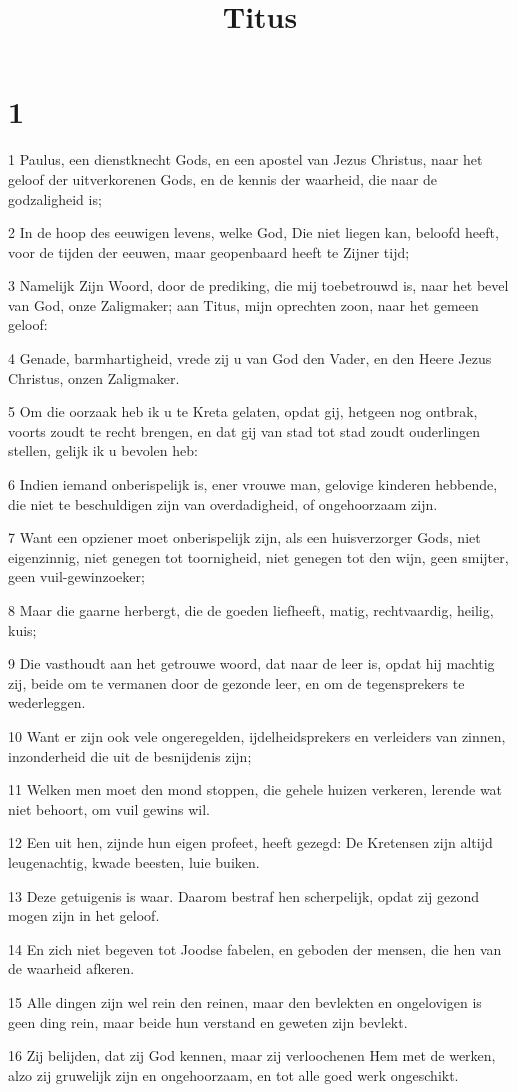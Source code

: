 

\title{Titus}



\chapter{1}

\par 1 Paulus, een dienstknecht Gods, en een apostel van Jezus Christus, naar het geloof der uitverkorenen Gods, en de kennis der waarheid, die naar de godzaligheid is;
\par 2 In de hoop des eeuwigen levens, welke God, Die niet liegen kan, beloofd heeft, voor de tijden der eeuwen, maar geopenbaard heeft te Zijner tijd;
\par 3 Namelijk Zijn Woord, door de prediking, die mij toebetrouwd is, naar het bevel van God, onze Zaligmaker; aan Titus, mijn oprechten zoon, naar het gemeen geloof:
\par 4 Genade, barmhartigheid, vrede zij u van God den Vader, en den Heere Jezus Christus, onzen Zaligmaker.
\par 5 Om die oorzaak heb ik u te Kreta gelaten, opdat gij, hetgeen nog ontbrak, voorts zoudt te recht brengen, en dat gij van stad tot stad zoudt ouderlingen stellen, gelijk ik u bevolen heb:
\par 6 Indien iemand onberispelijk is, ener vrouwe man, gelovige kinderen hebbende, die niet te beschuldigen zijn van overdadigheid, of ongehoorzaam zijn.
\par 7 Want een opziener moet onberispelijk zijn, als een huisverzorger Gods, niet eigenzinnig, niet genegen tot toornigheid, niet genegen tot den wijn, geen smijter, geen vuil-gewinzoeker;
\par 8 Maar die gaarne herbergt, die de goeden liefheeft, matig, rechtvaardig, heilig, kuis;
\par 9 Die vasthoudt aan het getrouwe woord, dat naar de leer is, opdat hij machtig zij, beide om te vermanen door de gezonde leer, en om de tegensprekers te wederleggen.
\par 10 Want er zijn ook vele ongeregelden, ijdelheidsprekers en verleiders van zinnen, inzonderheid die uit de besnijdenis zijn;
\par 11 Welken men moet den mond stoppen, die gehele huizen verkeren, lerende wat niet behoort, om vuil gewins wil.
\par 12 Een uit hen, zijnde hun eigen profeet, heeft gezegd: De Kretensen zijn altijd leugenachtig, kwade beesten, luie buiken.
\par 13 Deze getuigenis is waar. Daarom bestraf hen scherpelijk, opdat zij gezond mogen zijn in het geloof.
\par 14 En zich niet begeven tot Joodse fabelen, en geboden der mensen, die hen van de waarheid afkeren.
\par 15 Alle dingen zijn wel rein den reinen, maar den bevlekten en ongelovigen is geen ding rein, maar beide hun verstand en geweten zijn bevlekt.
\par 16 Zij belijden, dat zij God kennen, maar zij verloochenen Hem met de werken, alzo zij gruwelijk zijn en ongehoorzaam, en tot alle goed werk ongeschikt.

